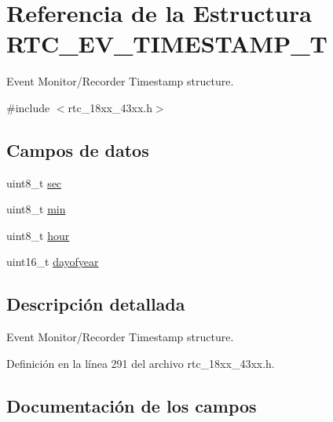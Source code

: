 \hypertarget{struct_r_t_c___e_v___t_i_m_e_s_t_a_m_p___t}{}\section{Referencia de la Estructura R\+T\+C\+\_\+\+E\+V\+\_\+\+T\+I\+M\+E\+S\+T\+A\+M\+P\+\_\+T}
\label{struct_r_t_c___e_v___t_i_m_e_s_t_a_m_p___t}


Event Monitor/\+Recorder Timestamp structure.  




{\ttfamily \#include $<$rtc\+\_\+18xx\+\_\+43xx.\+h$>$}

\subsection*{Campos de datos}
\begin{DoxyCompactItemize}
\item 
uint8\+\_\+t \hyperlink{struct_r_t_c___e_v___t_i_m_e_s_t_a_m_p___t_ad1696900026b287a87c563b733a21bc3}{sec}
\item 
uint8\+\_\+t \hyperlink{struct_r_t_c___e_v___t_i_m_e_s_t_a_m_p___t_ac9b481208b43f7c37ed25e446bdec692}{min}
\item 
uint8\+\_\+t \hyperlink{struct_r_t_c___e_v___t_i_m_e_s_t_a_m_p___t_ae5af4ff48939d13d480f87e56a9385d6}{hour}
\item 
uint16\+\_\+t \hyperlink{struct_r_t_c___e_v___t_i_m_e_s_t_a_m_p___t_a65bcb2841671d5e78b73cdc973553d34}{dayofyear}
\end{DoxyCompactItemize}


\subsection{Descripción detallada}
Event Monitor/\+Recorder Timestamp structure. 

Definición en la línea 291 del archivo rtc\+\_\+18xx\+\_\+43xx.\+h.



\subsection{Documentación de los campos}
